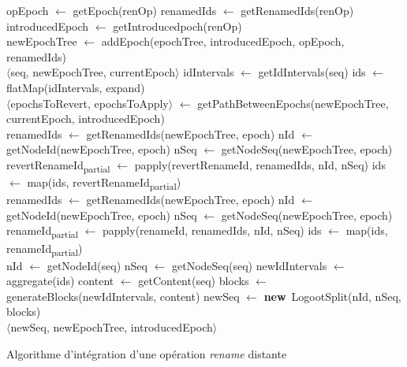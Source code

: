 \documentclass[12pt]{thesul}
\newcommand{\new}{\textbf{new}}
\newcommand{\lepoch}{$<_{\varepsilon}$~}
\begin{document}
\begin{algorithm}[!ht]
  \footnotesize
  \begin{algorithmic}[5]
          \State opEpoch $\gets$ getEpoch(renOp)
          \State renamedIds $\gets$ getRenamedIds(renOp)
          \State introducedEpoch $\gets$ getIntroducedpoch(renOp)
          \\
          \State newEpochTree $\gets$ addEpoch(epochTree, introducedEpoch, opEpoch, renamedIds) \label{alg:renameRemote-addEpoch}
          \\
          \If{introducedEpoch \lepoch currentEpoch}
            \State \Return $\langle$seq, newEpochTree, currentEpoch$\rangle$ \label{alg:renameRemote-return-1}
          \Else
            \State idIntervals $\gets$ getIdIntervals(seq) \label{alg:renameRemote-getIdIntervals}
            \State ids $\gets$ flatMap(idIntervals, expand) \label{alg:renameRemote-getIds}
            \\
            \State $\langle$epochsToRevert, epochsToApply$\rangle$ $\gets$ getPathBetweenEpochs(newEpochTree, currentEpoch, introducedEpoch) \label{alg:renameRemote-get-path}
            \\
             \label{alg:renameRemote-rename-1}
              \State renamedIds $\gets$ getRenamedIds(newEpochTree, epoch)
              \State nId $\gets$ getNodeId(newEpochTree, epoch)
              \State nSeq $\gets$ getNodeSeq(newEpochTree, epoch)
              \State revertRenameId\textsubscript{partial} $\gets$ papply(revertRenameId, renamedIds, nId, nSeq)
              \State ids $\gets$ map(ids, revertRenameId\textsubscript{partial})
            \EndFor
            \\
              \State renamedIds $\gets$ getRenamedIds(newEpochTree, epoch)
              \State nId $\gets$ getNodeId(newEpochTree, epoch)
              \State nSeq $\gets$ getNodeSeq(newEpochTree, epoch)
              \State renameId\textsubscript{partial} $\gets$ papply(renameId, renamedIds, nId, nSeq)
              \State ids $\gets$ map(ids, renameId\textsubscript{partial})
            \EndFor \label{alg:renameRemote-rename-2}
            \\
            \State nId $\gets$ getNodeId(seq)
            \State nSeq $\gets$ getNodeSeq(seq)
            \State newIdIntervals $\gets$ aggregate(ids)
            \State content $\gets$ getContent(seq)
            \State blocks $\gets$ generateBlocks(newIdIntervals, content)
            \State newSeq $\gets$ \new~LogootSplit(nId, nSeq, blocks) \label{alg:renameRemote-newSeq}
            \\
            \State \Return $\langle$newSeq, newEpochTree, introducedEpoch$\rangle$ \label{alg:renameRemote-return-2}
        \EndIf
      \EndFunction
  \end{algorithmic}
  \caption{Algorithme d'intégration d'une opération \emph{rename} distante}
  \label{alg:renameRemote}
\end{algorithm}
\end{document}
